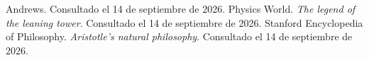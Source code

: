 \documentclass[11pt]{article}
\begin{document}
\begin{referencias}
  Andrews. Consultado el 14 de septiembre de 2026.
 Physics World. \emph{The legend of the leaning tower}. Consultado el 14
  de septiembre de 2026.
 Stanford Encyclopedia of Philosophy. \emph{Aristotle's natural
  philosophy}. Consultado el 14 de septiembre de 2026.
\end{referencias}
\end{document}
